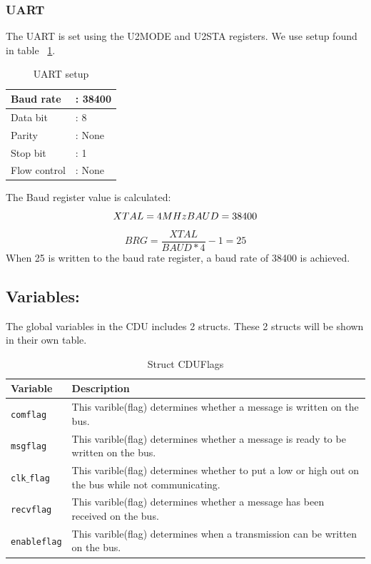 \subsubsection{UART}
The UART is set using the U2MODE and U2STA registers. We use setup found in table ~\ref{fig:uartsetp}.\\
\begin{table}[H]
	\centering
    \begin{tabular}{|l l|}
    \hline
    Baud rate    & : 38400 \\ \hline
    Data bit     & : 8    \\ \hline
    Parity       & : None \\ \hline
    Stop bit     & : 1    \\ \hline
    Flow control & : None \\ \hline
    \end{tabular}
    \caption{UART setup}
    \label{fig:uartsetp}
\end{table}
The Baud register value is calculated:\\
\begin{equation}
XTAL = 4 MHz $\\$ 
BAUD = 38400 
\end{equation}
\begin{equation}
BRG = \frac{XTAL}{BAUD*4} - 1 = 25
\end{equation}
When 25 is written to the baud rate register, a baud rate of 38400 is achieved.

\subsection{Variables:}
The global variables in the CDU includes 2 structs. These 2 structs will be shown in their own table.
\begin{table}[H]
\begin{tabular}{|l|p{10cm}|}
\hline
\cellcolor[gray]{0.8}\textbf{Variable} &\cellcolor[gray]{0.8} \textbf{Description}\\ \hline
\texttt{comflag} & This varible(flag) determines whether a message is written on the bus.\\ 
\hline
\texttt{msgflag} & This varible(flag) determines whether a message is ready to be written on the bus.\\ 
\hline
\texttt{clk$\_$flag} & This varible(flag) determines whether to put a low or high out on the bus while not communicating.\\ 
\hline
\texttt{recvflag} & This varible(flag) determines whether a message has been received on the bus.\\ 
\hline
\texttt{enableflag} & This varible(flag) determines when a transmission can be written on the bus.\\ 
\hline
\end{tabular}
\caption{Struct CDUFlags}
\label{tab:structcduflags}
\end{table}

